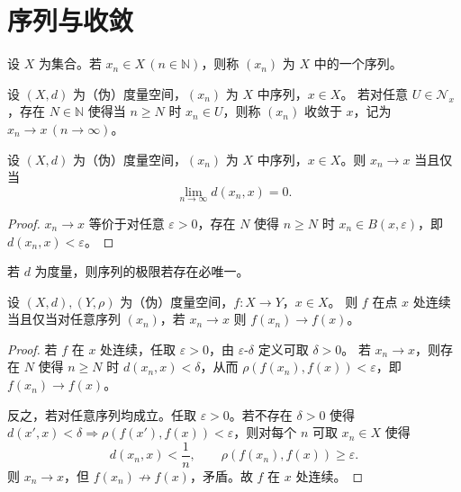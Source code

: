 \documentclass[lang=cn,a4paper,newtx,section]{elegantbook}
\begin{document}
\section{序列与收敛}

\begin{definition}
  设 $X$ 为集合。若 $x_n\in X\,(n\in\mathbb{N})$，则称 $(x_n)$ 为 $X$ 中的一个序列。
\end{definition}

\begin{definition}
  设 $(X,d)$ 为（伪）度量空间，$(x_n)$ 为 $X$ 中序列，$x\in X$。
  若对任意 $U\in\mathcal{N}_x$，存在 $N\in\mathbb{N}$ 使得当 $n\ge N$ 时 $x_n\in U$，则称 $(x_n)$ 收敛于 $x$，记为 $x_n\to x\,(n\to\infty)$。
\end{definition}

\begin{proposition}
  设 $(X,d)$ 为（伪）度量空间，$(x_n)$ 为 $X$ 中序列，$x\in X$。则 $x_n\to x$ 当且仅当
  \[
    \lim_{n\to\infty} d(x_n,x)=0.
  \]
\end{proposition}

\begin{proof}
  $x_n\to x$ 等价于对任意 $\varepsilon>0$，存在 $N$ 使得 $n\ge N$ 时 $x_n\in B(x,\varepsilon)$，即 $d(x_n,x)<\varepsilon$。
\end{proof}

\begin{remark}
  若 $d$ 为度量，则序列的极限若存在必唯一。
\end{remark}

\begin{proposition}
  设 $(X,d),(Y,\rho)$ 为（伪）度量空间，$f:X\to Y$，$x\in X$。
  则 $f$ 在点 $x$ 处连续当且仅当对任意序列 $(x_n)$，若 $x_n\to x$ 则 $f(x_n)\to f(x)$。
\end{proposition}

\begin{proof}
  若 $f$ 在 $x$ 处连续，任取 $\varepsilon>0$，由 $\varepsilon$-$\delta$ 定义可取 $\delta>0$。
  若 $x_n\to x$，则存在 $N$ 使得 $n\ge N$ 时 $d(x_n,x)<\delta$，从而 $\rho(f(x_n),f(x))<\varepsilon$，即 $f(x_n)\to f(x)$。

  反之，若对任意序列均成立。任取 $\varepsilon>0$。若不存在 $\delta>0$ 使得 $d(x',x)<\delta\Rightarrow \rho(f(x'),f(x))<\varepsilon$，则对每个 $n$ 可取 $x_n\in X$ 使得
  \[
    d(x_n,x)<\frac{1}{n},\qquad \rho(f(x_n),f(x))\ge\varepsilon.
  \]
  则 $x_n\to x$，但 $f(x_n)\not\to f(x)$，矛盾。故 $f$ 在 $x$ 处连续。
\end{proof}
\end{document}
